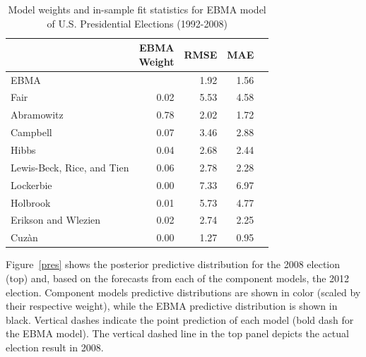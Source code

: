 \documentclass[12pt,fullpage,endnotes]{article}
\begin{document}
\begin{table}[ht]
\caption{Model weights and in-sample fit statistics for EBMA model of U.S. Presidential Elections (1992-2008)}
\label{presModel}
\begin{center}
\begin{tabular}{lrrrr}
  \toprule
 & \shortstack{EBMA\\ Weight}&RMSE &MAE \\ 
  \midrule
EBMA &  & 1.92 & 1.56 \\ 
  Fair & 0.02 & 5.53 & 4.58 \\ 
  Abramowitz & 0.78 & 2.02 & 1.72 \\ 
  Campbell  & 0.07 & 3.46 & 2.88 \\ 
  Hibbs  & 0.04 & 2.68 & 2.44 \\ 
  Lewis-Beck, Rice, and Tien & 0.06 & 2.78 & 2.28 \\ 
  Lockerbie  & 0.00 & 7.33 & 6.97 \\ 
 Holbrook & 0.01 & 5.73 & 4.77 \\ 
  Erikson and Wlezien & 0.02 & 2.74 & 2.25 \\ 
  Cuz\`an & 0.00 & 1.27 & 0.95 \\ 
   \bottomrule
\end{tabular}
\end{center}
\end{table}


Figure~\ref{pres} shows the posterior predictive distribution for the
2008 election (top) and, based on the forecasts from each of the
component models, the 2012 election.  Component models
predictive distributions are shown in color (scaled by their
respective weight), while the EBMA predictive distribution is shown in
black. Vertical dashes indicate the point prediction of each model
(bold dash for the EBMA model). The vertical dashed line in the top
panel depicts the actual election result in 2008.
\end{document}
